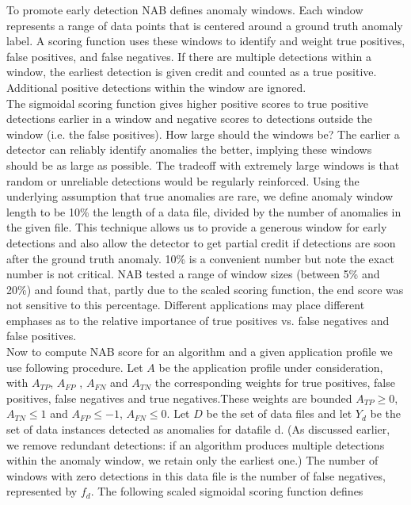 \documentclass[12pt]{article}
\begin{document}
\break
To promote early detection NAB defines anomaly windows. Each window represents a range of data points that is centered around a ground truth anomaly label. A scoring function uses these windows to identify and weight true positives, false positives, and false negatives. If there are multiple detections within a window, the earliest detection is given credit and counted as a true positive. Additional positive detections within the window are ignored. \\
\break
The sigmoidal scoring function gives higher positive scores to true positive detections earlier in a window and negative scores to detections outside the window (i.e. the false positives). How large should the windows be? The earlier a detector can reliably identify anomalies the better, implying these windows should be as large as possible. The tradeoff with extremely large windows is that random or unreliable detections would be regularly reinforced. Using the underlying assumption that true anomalies are rare, we define anomaly
window length to be 10\% the length of a data file, divided by the number of anomalies in the given file. This technique allows us to provide a generous window for early detections and also allow the detector to get partial credit if detections are soon after the ground truth anomaly. 10\% is a convenient number but note the exact number is not critical. NAB \cite{DBLP:journals/corr/LavinA15} tested a range of window sizes (between 5\% and 20\%) and found that, partly due to the scaled scoring function, the end score was not
sensitive to this percentage. Different applications may place different emphases as to
the relative importance of true positives vs. false negatives and
false positives. \\
\break
Now to compute NAB score for an algorithm and a given application profile we use following procedure. Let $A$ be the application profile under consideration, with $A_{TP}$, $A_{FP}$	, $A_{FN}$ and $A_{TN}$ the corresponding weights for true positives, false positives, false negatives and true negatives.These weights are bounded $A_{TP} \geq 0$, $A_{TN} \leq 1$ and 
$A_{FP} \leq -1$, $A_{FN} \leq 0$. Let $D$ be the set of data files and let $Y_d$ be the set of data instances detected as anomalies for datafile d. (As discussed earlier, we remove
redundant detections: if an algorithm produces multiple
detections within the anomaly window, we retain only the
earliest one.) The number of windows with zero detections in
this data file is the number of false negatives, represented by $f_d$. The following scaled sigmoidal scoring function defines
\end{document}
